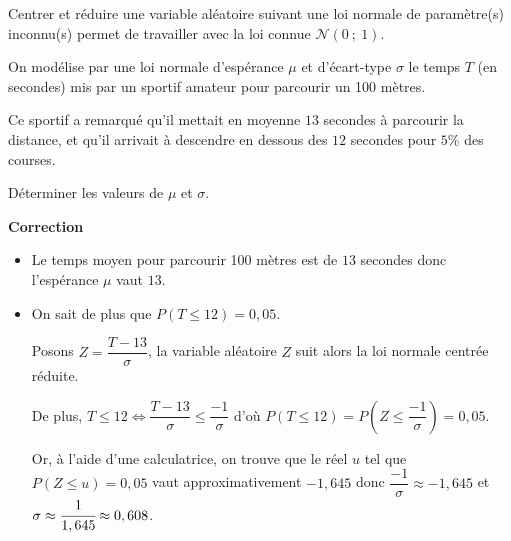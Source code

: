 \documentclass{cornouaille}
\begin{document}
\begin{methode}
Centrer et réduire une variable aléatoire suivant une loi normale de paramètre(s) inconnu(s) permet de travailler avec la loi connue $\mathcal{N}(0\ ;\ 1)$.

\exercice\label{methode6SP2} On modélise par une loi normale
d'espérance $\mu$ et d'écart-type $\sigma$ le temps $T$ (en secondes)
mis par un sportif amateur pour parcourir un 100 mètres.

Ce sportif a remarqué qu'il mettait en moyenne $13$ secondes à
parcourir la distance, et qu'il arrivait à descendre en dessous des
$12$ secondes pour $5\%$ des courses.

Déterminer les valeurs de $\mu$ et $\sigma$.

\textbf{Correction}


\begin{itemize}
\item Le temps moyen pour parcourir 100 mètres est de $13$ secondes donc l'espérance $\mu$ vaut $13$.
\item On sait de plus que $P(T\leqslant 12 )=0,05$.

Posons $Z=\dfrac{T-13}{\sigma}$, la variable aléatoire $Z$ suit alors la loi normale centrée réduite.

De plus, $T\leqslant 12 \Leftrightarrow \dfrac{T-13}{\sigma}\leqslant  \dfrac{-1}{\sigma}$ d'où $P(T\leqslant 12 )=P\left(Z\leqslant \dfrac{-1}{\sigma}\right)=0,05$.

Or, à l'aide d'une calculatrice, on trouve que le réel $u$ tel que $P(Z\leqslant u)=0,05$ vaut approximativement $-1,645$ donc $\dfrac{-1}{\sigma}\approx-1,645$ et $\sigma\approx\cfrac{1}{1,645}\approx0,608$.
\end{itemize}




~~
\end{methode}
\end{document}
